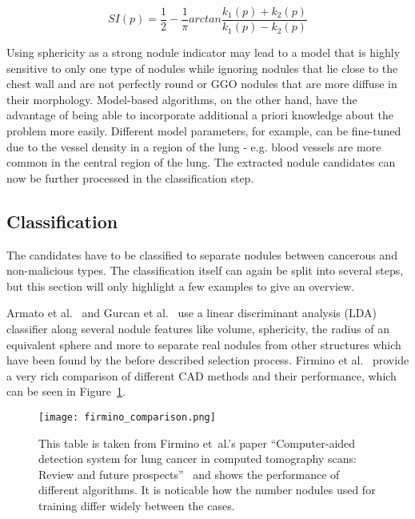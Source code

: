 \documentclass[main.tex]{subfiles}
\begin{document}
\begin{equation} \label{eq:SI}
SI(p)=\frac{1}{2}-\frac{1}{\pi}arctan\frac{k_1(p)+k_2(p)}{k_1(p)-k_2(p)}
\end{equation}

Using sphericity as a strong nodule indicator may lead to a model that is highly sensitive to only one type of nodules while ignoring nodules that lie close to the chest wall and are not perfectly round or GGO nodules that are more diffuse in their morphology. Model-based algorithms, on the other hand, have the advantage of being able to incorporate additional a priori knowledge about the problem more easily. Different model parameters, for example, can be fine-tuned due to the vessel density in a region of the lung - e.g. blood vessels are more common in the central region of the lung. The extracted nodule candidates can now be further processed in the classification step.


\subsection{Classification}
The candidates have to be classified to separate nodules between cancerous and non-malicious types. The classification itself can again be split into several steps, but this section will only highlight a few examples to give an overview. 

Armato et al.~\cite{armato1999computerized} and Gurcan et al.~\cite{gurcan2002lung} use a linear discriminant analysis (LDA) classifier along several nodule features like volume, sphericity, the radius of an equivalent sphere and more to separate real nodules from other structures which have been found by the before described selection process. Firmino et al.~\cite{firmino2014computer} provide a very rich comparison of different CAD methods and their performance, which can be seen in Figure~\ref{fig:firmino_comp}.

\begin{figure}[H]
\centering
\texttt{[image: firmino\_comparison.png]}
\caption{This table is taken from Firmino et~al.'s paper ``Computer-aided detection system for lung cancer in computed tomography scans: Review and future prospects''~\cite{firmino2014computer} and shows the performance of different algorithms. It is noticable how the number nodules used for training differ widely between the cases.}
\label{fig:firmino_comp}
\end{figure}
\end{document}
